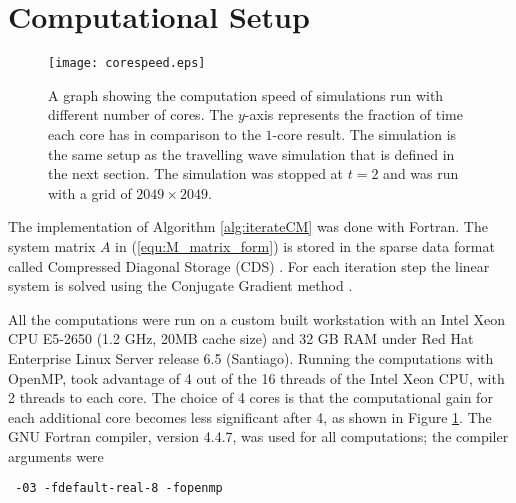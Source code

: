\section{Computational Setup}

\begin{figure}[!htp]
  \centering
  \texttt{[image: corespeed.eps]}
  \caption{A graph showing the computation speed of simulations run with different number of cores.
    The $y$-axis represents the fraction of time each core has in comparison to the $1$-core result.
    The simulation is the same setup as the travelling wave simulation that is defined in the next section.
    The simulation was stopped at $t = 2$ and was run with a grid of $2049 \times 2049$. }
  \label{fig:corespeed}
\end{figure}

The implementation of Algorithm \ref{alg:iterateCM} was done with Fortran. 
The system matrix $A$ in (\ref{equ:M_matrix_form}) is stored in the sparse data format called Compressed Diagonal Storage (CDS) \citep{barret1987templates}.
For each iteration step the linear system is solved using the Conjugate Gradient method \citep{saad2003iterativeMethod}.

All the computations were run on a custom built workstation with an Intel Xeon CPU E5-2650 (1.2 GHz, 20MB cache size) and 32 GB RAM under Red Hat Enterprise Linux Server release 6.5 (Santiago). 
Running the computations with OpenMP, took advantage of 4 out of the 16 threads of the Intel Xeon CPU, with 2 threads to each core.
The choice of 4 cores is that the computational gain for each additional core becomes less significant after 4, as shown in Figure \ref{fig:corespeed}.
The GNU Fortran compiler, version 4.4.7, was used for all computations; the compiler arguments were
\begin{verbatim} -03 -fdefault-real-8 -fopenmp \end{verbatim}



